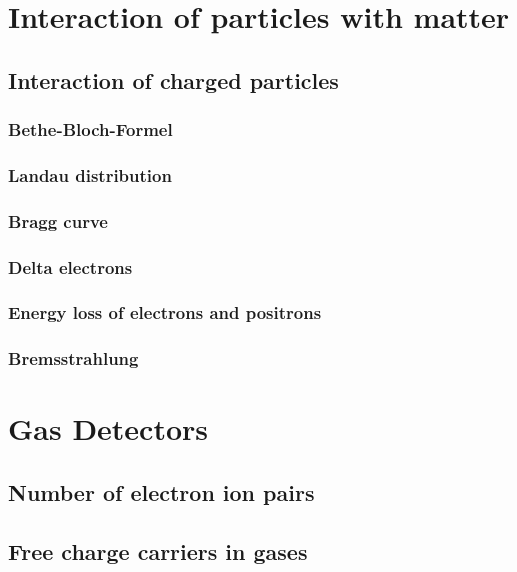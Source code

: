 \documentclass{article}
\begin{document}
\section{Interaction of particles with matter}
\graphicspath{{bilder/1-1/}}
	\subsection{Interaction of charged particles}
		
			\subsubsection{Bethe-Bloch-Formel}
				
			\subsubsection{Landau distribution}
				
			\subsubsection{Bragg curve}
				
			\subsubsection{Delta electrons}
				
			\subsubsection{Energy loss of electrons and positrons}
				
			\subsubsection{Bremsstrahlung}
				

\section{Gas Detectors}
\graphicspath{{bilder/3-1/}}
 
	\subsection{Number of electron ion pairs}
		
	\subsection{Free charge carriers in gases}
		
\end{document}
